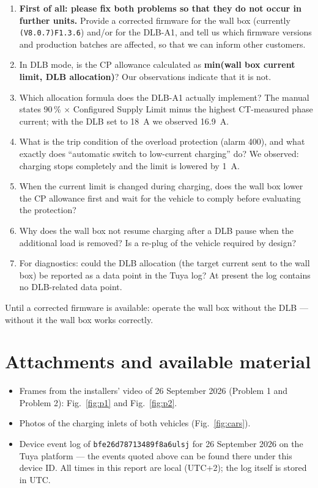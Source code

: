 \documentclass[11pt,a4paper]{article}
\begin{document}
\begin{enumerate}
\item \textbf{First of all: please fix both problems so that they do not occur in further units.} Provide a corrected firmware for the wall box (currently \texttt{(V8.0.7)F1.3.6}) and/or for the DLB-A1, and tell us which firmware versions and production batches are affected, so that we can inform other customers.
\item In DLB mode, is the CP allowance calculated as \textbf{min(wall box current limit, DLB allocation)}? Our observations indicate that it is not.
\item Which allocation formula does the DLB-A1 actually implement? The manual states 90\,\% $\times$ Configured Supply Limit minus the highest CT-measured phase current; with the DLB set to 18~A we observed 16.9~A.
\item What is the trip condition of the overload protection (alarm 400), and what exactly does ``automatic switch to low-current charging'' do? We observed: charging stops completely and the limit is lowered by 1~A.
\item When the current limit is changed during charging, does the wall box lower the CP allowance first and wait for the vehicle to comply before evaluating the protection?
\item Why does the wall box not resume charging after a DLB pause when the additional load is removed? Is a re-plug of the vehicle required by design?
\item For diagnostics: could the DLB allocation (the target current sent to the wall box) be reported as a data point in the Tuya log? At present the log contains no DLB-related data point.
\end{enumerate}

\begin{apgreenb}
Until a corrected firmware is available: operate the wall box without the DLB — without it the wall box works correctly.
\end{apgreenb}

\section{Attachments and available material}

\begin{itemize}
\item Frames from the installers' video of 26 September 2026 (Problem 1 and Problem 2): Fig.~\ref{fig:p1} and Fig.~\ref{fig:p2}.
\item Photos of the charging inlets of both vehicles (Fig.~\ref{fig:cars}).
\item Device event log of \texttt{bfe26d78713489f8a6ulsj} for 26 September 2026 on the Tuya platform — the events quoted above can be found there under this device ID. All times in this report are local (UTC+2); the log itself is stored in UTC.
\end{itemize}
\end{document}

